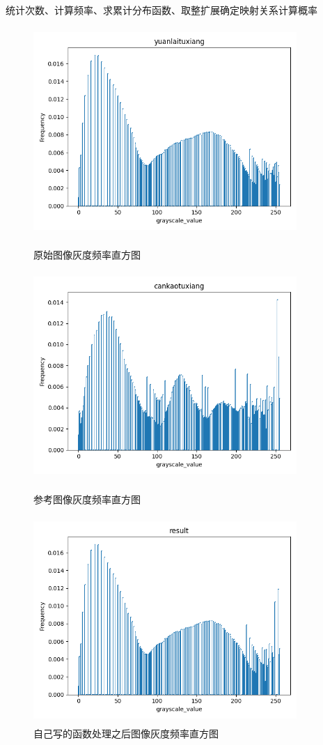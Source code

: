 \documentclass{article}
\begin{document}
   统计次数、计算频率、求累计分布函数、取整扩展确定映射关系计算概率
   \begin{figure}[h!]
                \centering
                \includegraphics[width=10cm,height=7.9cm]{xuan20.png}
                \caption{原始图像灰度频率直方图}
                \includegraphics[width=10cm,height=7.9cm]{xuan30.png}
                \caption{参考图像灰度频率直方图}
                \includegraphics[width=10cm,height=7.9cm]{xuan40.png}
                \caption{自己写的函数处理之后图像灰度频率直方图}
                \end{figure}
\clearpage
\newpage
\end{document}
